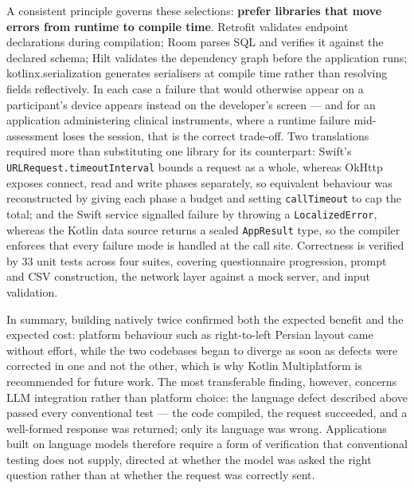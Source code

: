 A consistent principle governs these selections: \textbf{prefer libraries that move errors from
runtime to compile time}. Retrofit validates endpoint declarations during compilation; Room
parses SQL and verifies it against the declared schema; Hilt validates the dependency graph
before the application runs; kotlinx.serialization generates serialisers at compile time rather
than resolving fields reflectively. In each case a failure that would otherwise appear on a
participant's device appears instead on the developer's screen --- and for an application
administering clinical instruments, where a runtime failure mid-assessment loses the session,
that is the correct trade-off. Two translations required more than substituting one library for
its counterpart: Swift's \texttt{URLRequest.timeoutInterval} bounds a request as a whole,
whereas OkHttp exposes connect, read and write phases separately, so equivalent behaviour was
reconstructed by giving each phase a budget and setting \texttt{callTimeout} to cap the total;
and the Swift service signalled failure by throwing a \texttt{LocalizedError}, whereas the
Kotlin data source returns a sealed \texttt{AppResult} type, so the compiler enforces that every
failure mode is handled at the call site. Correctness is verified by 33 unit tests across four
suites, covering questionnaire progression, prompt and CSV construction, the network layer
against a mock server, and input validation.

In summary, building natively twice confirmed both the expected benefit and the expected cost:
platform behaviour such as right-to-left Persian layout came without effort, while the two
codebases began to diverge as soon as defects were corrected in one and not the other, which is
why Kotlin Multiplatform is recommended for future work. The most transferable finding, however,
concerns LLM integration rather than platform choice: the language defect described above passed
every conventional test --- the code compiled, the request succeeded, and a well-formed response
was returned; only its language was wrong. Applications built on language models therefore
require a form of verification that conventional testing does not supply, directed at whether
the model was asked the right question rather than at whether the request was correctly sent.

